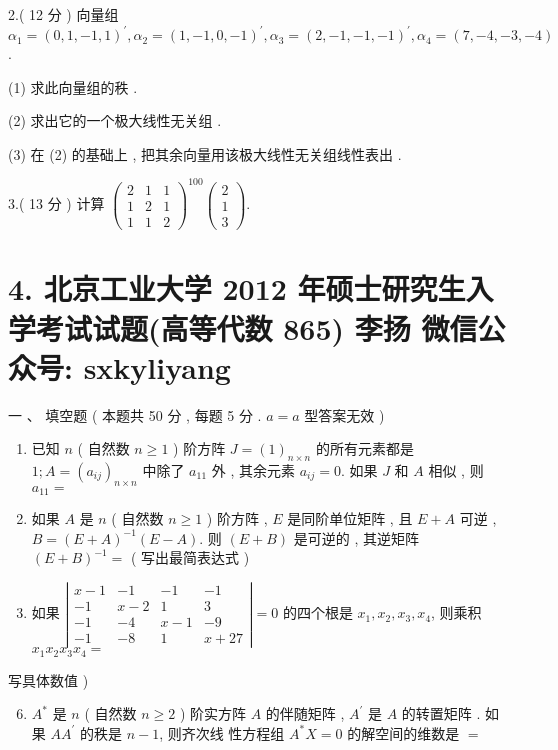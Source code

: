 \documentclass[10pt]{article}
\begin{document}
{2.( 12  分 )  向量组  $\alpha_{1}=(0,1,-1,1)^{\prime}, \alpha_{2}=(1,-1,0,-1)^{\prime}, \alpha_{3}=(2,-1,-1,-1)^{\prime}, \alpha_{4}=(7,-4,-3,-4)$.

(1)  求此向量组的秩 .

(2)  求出它的一个极大线性无关组 .

(3)  在  (2)  的基础上 ,  把其余向量用该极大线性无关组线性表出 .

3.( 13  分 )  计算  $\left(\begin{array}{lll}2 & 1 & 1 \\ 1 & 2 & 1 \\ 1 & 1 & 2\end{array}\right)^{100}\left(\begin{array}{l}2 \\ 1 \\ 3\end{array}\right)$.

\section{4. 北京工业大学 2012 年硕士研究生入学考试试题(高等代数 865) 
 李扬 
 微信公众号: sxkyliyang}
 一 、 填空题 ( 本题共  50  分 , 每题  5  分 . $a=a$  型答案无效 )

\begin{enumerate}
  \item  已知  $n$ ( 自然数  $n \geq 1$ )  阶方阵  $J=(1)_{n \times n}$  的所有元素都是  $1 ; A=\left(a_{i j}\right)_{n \times n}$  中除了  $a_{11}$  外 ,  其余元素  $a_{i j}=0$.  如果  $J$  和  $A$  相似 ,  则  $a_{11}=$

  \item  如果  $A$  是  $n$ ( 自然数  $n \geq 1$ )  阶方阵 , $E$  是同阶单位矩阵 ,  且  $E+A$  可逆 , $B=(E+A)^{-1}(E-A)$.  则  $(E+B)$  是可逆的 ,  其逆矩阵  $(E+B)^{-1}=$ ( 写出最简表达式 )

  \item  如果  $\left|\begin{array}{cccc}x-1 & -1 & -1 & -1 \\ -1 & x-2 & 1 & 3 \\ -1 & -4 & x-1 & -9 \\ -1 & -8 & 1 & x+27\end{array}\right|=0$  的四个根是  $x_{1}, x_{2}, x_{3}, x_{4}$,  则乘积  $x_{1} x_{2} x_{3} x_{4}=$

\end{enumerate}
 写具体数值 )

\begin{enumerate}
  \setcounter{enumi}{5}
  \item $A^{*}$  是  $n$ ( 自然数  $n \geq 2$ )  阶实方阵  $A$  的伴随矩阵 , $A^{\prime}$  是  $A$  的转置矩阵 .  如果  $A A^{\prime}$  的秩是  $n-1$,  则齐次线   性方程组  $A^{*} X=0$  的解空间的维数是  $=$


\end{enumerate}}
\end{document}

